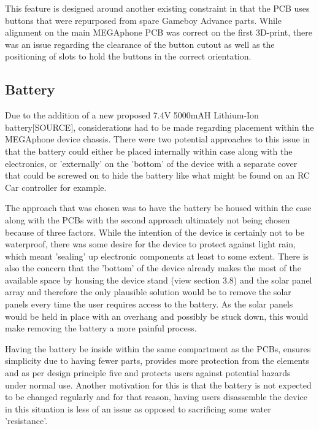 This feature is designed around another existing constraint in that the PCB uses buttons that were repurposed from spare Gameboy Advance parts. %
While alignment on the main MEGAphone PCB was correct on the first 3D-print, there was an issue regarding the clearance of the button cutout as well as the positioning of slots to hold the buttons in the correct orientation.

\subsection{Battery}

Due to the addition of a new proposed 7.4V 5000mAH Lithium-Ion battery[SOURCE], considerations had to be made regarding placement within the MEGAphone device chassis.
There were two potential approaches to this issue in that the battery could either be placed internally within case along with the electronics, or 'externally' on the 'bottom' of the device with a separate cover that could be screwed on to hide the battery like what might be found on an RC Car controller for example.

The approach that was chosen was to have the battery be housed within the case along with the PCBs with the second approach ultimately not being chosen because of three factors.
While the intention of the device is certainly not to be waterproof, there was some desire for the device to protect against light rain, which meant 'sealing' up electronic components at least to some extent.
There is also the concern that the 'bottom' of the device already makes the most of the available space by housing the device stand (view section 3.8) and the solar panel array and therefore the only plausible solution would be to remove the solar panels every time the user requires access to the battery.
As the solar panels would be held in place with an overhang and possibly be stuck down, this would make removing the battery a more painful process.

Having the battery be inside within the same compartment as the PCBs, ensures simplicity due to having fewer parts, provides more protection from the elements and as per design principle five and protects users against potential hazards under normal use.
Another motivation for this is that the battery is not expected to be changed regularly and for that reason, having users disassemble the device in this situation is less of an issue as opposed to sacrificing some water 'resistance'.

